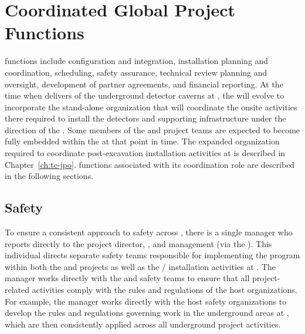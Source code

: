 \section{Coordinated Global Project Functions}
\label{sec:global_project}

 functions include  configuration and 
integration, installation planning and coordination, scheduling, 
safety assurance, technical review planning and oversight, development of partner agreements, and financial reporting.  At 
the time when   delivers
 of the underground detector caverns at 
, the  will evolve to incorporate the 
stand-alone organization that will coordinate the 
onsite activities there required to install the detectors and 
supporting infrastructure under the direction of the .  
Some members of the  and  project 
teams are expected to become fully embedded within the 
 at that point in time.  The expanded  
organization required to coordinate post-excavation
installation activities at  is described in 
Chapter~\ref{ch:tc-jpo}.   functions associated with 
its  coordination role are described in the 
following sections.

\subsection{Safety}
\label{sec:dune_safety}

To ensure a consistent approach to safety across ,
there is a single   manager who reports directly 
to the  project director, , and 
management (via the  ).  This individual
directs separate safety teams responsible for implementing the 
  program within both the  
and  projects as well as the /
 installation activities at .  The 
  manager works directly with the  
and  safety teams to ensure that all project-related 
activities comply with the rules and regulations of the host 
organizations.  For example, the   manager 
works directly with the host safety organizations to develop the 
rules and regulations governing work in the underground areas 
at , which are then consistently applied across all 
underground project activities.

